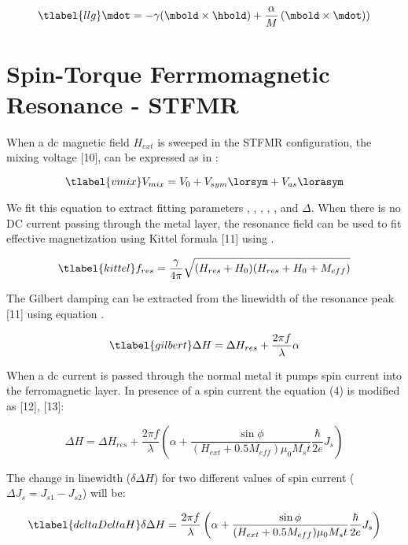 \begin{equation}
    \tlabel{llg}
    \mdot = -\gamma(\mbold \times \hbold)+ \frac{\alpha}{M} \left(\mbold \times \mdot)\right)
\end{equation}

\section{Spin-Torque Ferrmomagnetic Resonance - STFMR}
When a dc magnetic field $H_{ext}$ is sweeped in the STFMR configuration, the mixing 
voltage [10], can be expressed as in :

\begin{equation}
    \tlabel{vmix}
    V_{mix} = V_{0} + V_{sym} \lorsym + V_{as} \lorasym
\end{equation}

We fit this equation to extract fitting parameters \vo, \hres, \vsym, \vas, \hres, and $\Delta$. 
When there is no DC current passing through the metal layer, the resonance field can be used to 
fit effective magnetization using Kittel formula [11] using .

\begin{equation}
    \tlabel{kittel}
    f_{res} = \frac{\gamma}{4\pi} \sqrt{(H_{res} + H_{0})(H_{res} + H_{0} + M_{eff})}
\end{equation}

The Gilbert damping can be extracted from the linewidth of the resonance peak [11] using equation .

\begin{equation}
    \tlabel{gilbert}
    \Delta H = \Delta H_{res} + \frac{2\pi f}{\lambda}\alpha
\end{equation}

When a dc current is passed through the normal metal it pumps spin current into the ferromagnetic 
layer. In presence of a spin current the equation (4) is modified as [12], [13]:

\begin{equation}
    \Delta H = \Delta H_{res} + \frac{2\pi f}{\lambda} \left( 
        \alpha + \frac{\sin{\phi}}{(H_{ext} + 0.5M_{eff}) \mu_{0} M_{s} t}  
        \frac{\hbar}{2e}J_{s}
    \right)
\end{equation}

The change in linewidth ($\delta \Delta H$) for two different values of spin current 
($\Delta J_{s} = J_{s1} - J_{s2}$) will be:

\begin{equation}
    \tlabel{deltaDeltaH}
    \delta \Delta H = \frac{2\pi f}{\lambda} \left( 
        \alpha + \frac{\sin{\phi}}{(H_{ext} + 0.5M_{eff}) \mu_{0} M_{s} t} 
        \frac{\hbar}{2e}J_{s}
        \right)
\end{equation}

